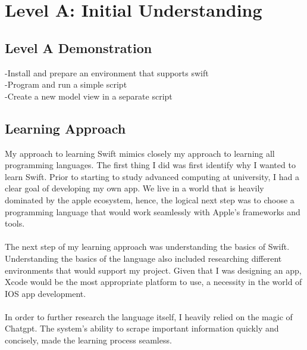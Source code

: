\documentclass[a4paper, 11pt]{report}
\begin{document}

\tableofcontents



\newpage
\section{Level A: Initial Understanding}
\vspace{5mm}
\subsection{Level A Demonstration}
-Install and prepare an environment that supports swift\\
-Program and run a simple script\\
-Create a new model view in a separate script

\subsection{Learning Approach}
My approach to learning Swift mimics closely my approach to learning all programming languages. The first thing I did was first identify why I wanted to learn Swift. Prior to starting to study advanced computing at university, I had a clear goal of developing my own app. We live in a world that is heavily dominated by the apple ecosystem, hence, the logical next step was to choose a programming language that would work seamlessly with Apple’s frameworks and tools.\\
\\
The next step of my learning approach was understanding the basics of Swift. Understanding the basics of the language also included researching different environments that would support my project. Given that I was designing an app, Xcode would be the most appropriate platform to use, a necessity in the world of IOS app development.\\
\\
In order to further research the language itself, I heavily relied on the magic of Chatgpt. The system’s ability to scrape important information quickly and concisely, made the learning process seamless.
\end{document}
